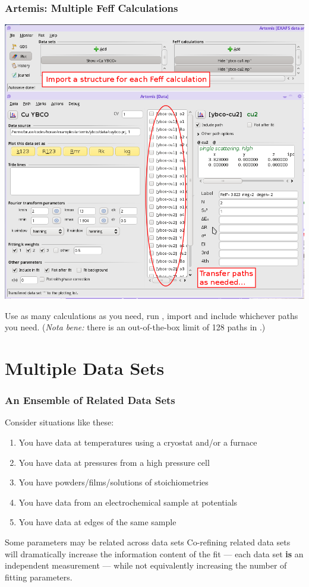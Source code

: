 \documentclass[10pt, xcolor=x11names, compress]{beamer}
\begin{document}
\begin{frame}
  \frametitle{Artemis: Multiple Feff Calculations}

  \begin{center}
    \includegraphics[width=0.6\linewidth]{artemis/mfc.png}

    Use as many {\feff} calculations as you need, run {\feff}, import
    and include whichever paths you need.  (\textit{Nota bene:} there
    is an out-of-the-box limit of 128 paths in {\artemis}.)
  \end{center}
\end{frame}

\section[MDS]{Multiple Data Sets}

\begin{frame}
  \frametitle{An Ensemble of Related Data Sets}

  Consider situations like these:
  \begin{enumerate}
  \item You have data at {\multiple} temperatures using a cryostat
    and/or a furnace
  \item You have data at {\multiple} pressures from a high pressure cell
  \item You have powders/films/solutions of {\multiple} stoichiometries
  \item You have data from an electrochemical sample at {\multiple} potentials
  \item You have data at {\multiple} edges of the same sample
  \end{enumerate}

  \bigskip

  \begin{block}{Some parameters may be related across data sets}
    Co-refining related data sets will dramatically increase the
    information content of the fit --- each data set \textbf{is} an
    independent measurement --- while not equivalently increasing the
    number of fitting parameters.
  \end{block}
\end{frame}
\end{document}
